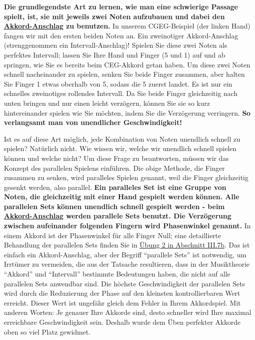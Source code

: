 \textbf{Die grundlegendste Art zu lernen, wie man eine schwierige Passage spielt, ist, sie mit jeweils zwei Noten aufzubauen und dabei den \hyperref[c1ii9]{Akkord-Anschlag} zu benutzen.} In unserem CGEG-Beispiel (der linken Hand) fangen wir mit den ersten beiden Noten an.
Ein zweinotiger Akkord-Anschlag (strenggenommen ein Intervall-Anschlag)!
Spielen Sie diese zwei Noten als perfektes Intervall; lassen Sie Ihre Hand und Finger (5 und 1) auf und ab springen, wie Sie es bereits beim CEG-Akkord getan haben.
Um diese zwei Noten schnell nacheinander zu spielen, senken Sie beide Finger zusammen, aber halten Sie Finger 1 etwas oberhalb von 5, sodass die 5 zuerst landet.
Es ist nur ein schnelles zweinotiges rollendes Intervall.
Da Sie beide Finger gleichzeitig nach unten bringen und nur einen leicht verzögern, können Sie sie so kurz hintereinander spielen wie Sie möchten, indem Sie die Verzögerung verringern.
\textbf{So verlangsamt man von unendlicher Geschwindigkeit!}

Ist es auf diese Art möglich, jede Kombination von Noten unendlich schnell zu spielen? Natürlich nicht.
Wie wissen wir, welche wir unendlich schnell spielen können und welche nicht?
Um diese Frage zu beantworten, müssen wir das Konzept des parallelen Spielens einführen.
Die obige Methode, die Finger zusammen zu senken, wird paralleles Spielen genannt, weil die Finger gleichzeitig gesenkt werden, also parallel.
\textbf{Ein paralleles Set ist eine Gruppe von Noten, die gleichzeitig mit einer Hand gespielt werden können.
Alle parallelen Sets können unendlich schnell gespielt werden - beim \hyperref[c1ii9]{Akkord-Anschlag} werden parallele Sets benutzt.
Die Verzögerung zwischen aufeinander folgenden Fingern wird Phasenwinkel genannt.}
In einem Akkord ist der Phasenwinkel für alle Finger Null; eine detaillierte Behandlung der parallelen Sets finden Sie in \hyperref[c1iii7b2]{Übung 2 in Abschnitt III.7b}.
Das ist einfach ein Akkord-Anschlag, aber der Begriff \enquote{parallele Sets} ist notwendig, um Irrtümer zu vermeiden, die aus der Tatsache resultieren, dass in der Musiktheorie \enquote{Akkord} und \enquote{Intervall} bestimmte Bedeutungen haben, die nicht auf alle parallelen Sets anwendbar sind.
Die höchste Geschwindigkeit der parallelen Sets wird durch die Reduzierung der Phase auf den kleinsten kontrollierbaren Wert erreicht.
Dieser Wert ist ungefähr gleich dem Fehler in Ihrem Akkordspiel.
Mit anderen Worten: Je genauer Ihre Akkorde sind, desto schneller wird Ihre maximal erreichbare Geschwindigkeit sein.
Deshalb wurde dem Üben perfekter Akkorde oben so viel Platz gewidmet.

